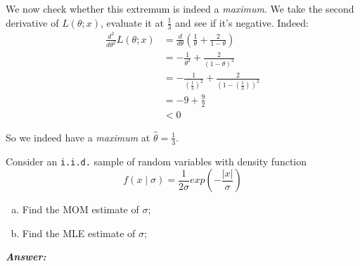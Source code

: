 \documentclass[12pt]{article}
\newenvironment{question}[2][Question]{\begin{trivlist}
\item[\hskip \labelsep {\bfseries #1}\hskip \labelsep {\bfseries #2.}]}{\end{trivlist}}
\begin{document}
We now check whether this extremum is indeed a \emph{maximum}. We take the second derivative of $L(\theta; x)$, evaluate it at $\frac{1}{3}$ and see if it's negative. Indeed:
\begin{align*}
\frac{d^2} {d \theta^2} L(\theta; x) &= \frac{d} {d \theta} \left(\frac{1}{\theta} + \frac{2}{1 - \theta} \right) \\
&= -\frac{1}{\theta^2} + \frac{2}{(1 - \theta)^2} \\
&= -\frac{1}{(\frac{1}{3})^2} + \frac{2}{(1 - (\frac{1}{3}))^2} \\
&= -9 + \frac{9}{2}\\
&< 0 
\end{align*}
\begin{center}
So we indeed have a \emph{maximum} at  $\hat \theta = \frac{1}{3}$.
\end{center}

\bigskip
\bigskip
 \begin{question}{4.2} Consider an \texttt{i.i.d.} sample of random variables with density function
 $$
f(x \mid \sigma) = \frac{1}{2\sigma}exp(- \frac{|x|}{\sigma})
 $$
 \begin{enumerate}[(a)]
\item Find the MOM estimate of $\sigma$;
\item Find the MLE estimate of $\sigma$;
\end{enumerate}
\end{question} 


  \textbf{\color{TealBlue}\emph{Answer:} } 
 
\end{document}
